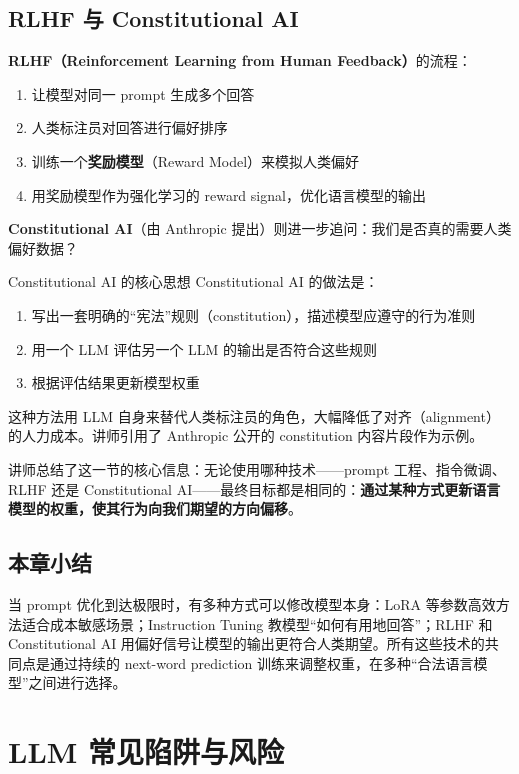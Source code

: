\documentclass[a4paper]{article}
\begin{document}
\subsection{RLHF 与 Constitutional AI}

\textbf{RLHF（Reinforcement Learning from Human Feedback）}的流程：
\begin{enumerate}
    \item 让模型对同一 prompt 生成多个回答
    \item 人类标注员对回答进行偏好排序
    \item 训练一个\textbf{奖励模型}（Reward Model）来模拟人类偏好
    \item 用奖励模型作为强化学习的 reward signal，优化语言模型的输出
\end{enumerate}

\textbf{Constitutional AI}（由 Anthropic 提出）则进一步追问：我们是否真的需要人类偏好数据？

\begin{knowledgebox}{Constitutional AI 的核心思想}
Constitutional AI 的做法是：
\begin{enumerate}
    \item 写出一套明确的``宪法''规则（constitution），描述模型应遵守的行为准则
    \item 用一个 LLM 评估另一个 LLM 的输出是否符合这些规则
    \item 根据评估结果更新模型权重
\end{enumerate}
这种方法用 LLM 自身来替代人类标注员的角色，大幅降低了对齐（alignment）的人力成本。讲师引用了 Anthropic 公开的 constitution 内容片段作为示例。
\end{knowledgebox}

讲师总结了这一节的核心信息：无论使用哪种技术——prompt 工程、指令微调、RLHF 还是 Constitutional AI——最终目标都是相同的：\textbf{通过某种方式更新语言模型的权重，使其行为向我们期望的方向偏移}。

\subsection{本章小结}

当 prompt 优化到达极限时，有多种方式可以修改模型本身：LoRA 等参数高效方法适合成本敏感场景；Instruction Tuning 教模型``如何有用地回答''；RLHF 和 Constitutional AI 用偏好信号让模型的输出更符合人类期望。所有这些技术的共同点是通过持续的 next-word prediction 训练来调整权重，在多种``合法语言模型''之间进行选择。

\section{LLM 常见陷阱与风险}
\end{document}
